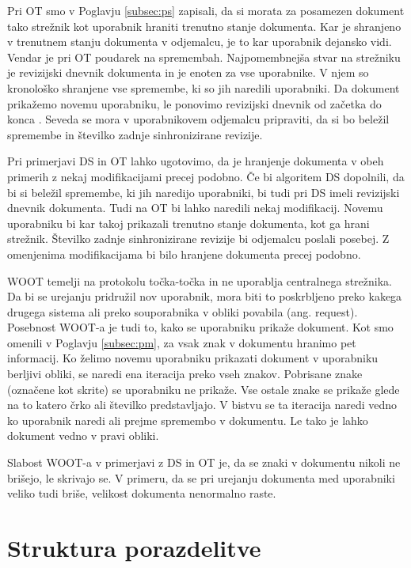 \documentclass[a4paper, 12pt, twoside]{book}
\begin{document}
Pri OT smo v Poglavju \ref{subsec:ps} zapisali, da si morata za posamezen dokument tako strežnik kot uporabnik hraniti trenutno stanje dokumenta. Kar je shranjeno v trenutnem stanju dokumenta v odjemalcu, je to kar uporabnik dejansko vidi. Vendar je pri OT poudarek na spremembah. Najpomembnejša stvar na strežniku je revizijski dnevnik dokumenta in je enoten za vse uporabnike. V njem so kronološko shranjene vse spremembe, ki so jih naredili uporabniki. Da dokument prikažemo novemu uporabniku, le ponovimo revizijski dnevnik od začetka do konca \cite{gdocs22}. Seveda se mora v uporabnikovem odjemalcu pripraviti, da si bo beležil spremembe in številko zadnje sinhronizirane revizije.

Pri primerjavi DS in OT lahko ugotovimo, da je hranjenje dokumenta v obeh primerih z nekaj modifikacijami precej podobno. Če bi algoritem DS dopolnili, da bi si beležil spremembe, ki jih naredijo uporabniki, bi tudi pri DS imeli revizijski dnevnik dokumenta. Tudi na OT bi lahko naredili nekaj modifikacij. Novemu uporabniku bi kar takoj prikazali trenutno stanje dokumenta, kot ga hrani strežnik. Številko zadnje sinhronizirane revizije bi odjemalcu poslali posebej. Z omenjenima modifikacijama bi bilo hranjene dokumenta precej podobno.

WOOT temelji na protokolu točka-točka in ne uporablja centralnega strežnika. Da bi se urejanju pridružil nov uporabnik, mora biti to poskrbljeno preko kakega drugega sistema ali preko souporabnika v obliki povabila (ang. request). Posebnost WOOT-a je tudi to, kako se uporabniku prikaže dokument. Kot smo omenili v Poglavju \ref{subsec:pm}, za vsak znak v dokumentu hranimo pet informacij. Ko želimo novemu uporabniku prikazati dokument v uporabniku berljivi obliki, se naredi ena iteracija preko vseh znakov. Pobrisane znake (označene kot skrite) se uporabniku ne prikaže. Vse ostale znake se prikaže glede na to katero črko ali številko predstavljajo. V bistvu se ta iteracija naredi vedno ko uporabnik naredi ali prejme spremembo v dokumentu. Le tako je lahko dokument vedno v pravi obliki.

Slabost WOOT-a v primerjavi z DS in OT je, da se znaki v dokumentu nikoli ne brišejo, le skrivajo se. V primeru, da se pri urejanju dokumenta med uporabniki veliko tudi briše, velikost dokumenta nenormalno raste.

\section{Struktura porazdelitve}
\end{document}
